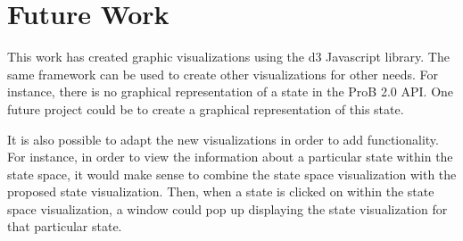 \section{Future Work}

This work has created graphic visualizations using the d3 Javascript library. The same framework can be used to create other visualizations for other needs. For instance, there is no graphical representation of a state in the ProB 2.0 API. One future project could be to create a graphical representation of this state.

It is also possible to adapt the new visualizations in order to add functionality. For instance, in order to view the information about a particular state within the state space, it would make sense to combine the state space visualization with the proposed state visualization. Then, when a state is clicked on within the state space visualization, a window could pop up displaying the state visualization for that particular state.